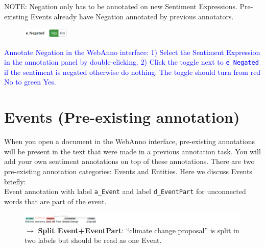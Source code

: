 \noindent
\textcolor{BrickRed}{NOTE: Negation only has to be annotated on new Sentiment Expressions. Pre-existing Events already have Negation annotated by previous annotators.}\\

\begin{figure}
    \centering
    \includegraphics[width=0.2\textwidth]{img/negationui.png}
    \label{fig:negationui}
\end{figure}

\noindent
\textcolor{Blue}{Annotate Negation in the WebAnno interface:
1) Select the Sentiment Expression in the annotation panel by double-clicking.
2) Click the toggle next to \texttt{e\_Negated} if the sentiment is negated otherwise do nothing. The toggle should turn from red No to green Yes.}

\section{Events (Pre-existing annotation)}
\label{sec:eventdefinition}
When you open a document in the WebAnno interface, pre-existing annotations will be present in the text that were made in a previous annotation task.
You will add your own sentiment annotations on top of these annotations.
There are two pre-existing annotation categories: Events and Entities.
Here we discuss Events briefly:\\
\eventcolor Event annotation with label \texttt{a\_Event} and label \texttt{d\_EventPart} for unconnected words that are part of the event.

\begin{figure}[!htb]
    \centering
    \includegraphics[width=\textwidth]{img/cvx00s01 event part.png}
    \caption*{$\rightarrow$ \textbf{Split Event+EventPart}: ``climate change proposal'' is split in two labels but should be read as one Event.}
\end{figure}


